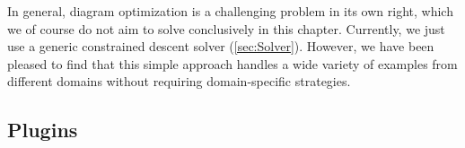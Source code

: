 
In general, diagram optimization is a challenging problem in its own right, which we of course do not aim to solve conclusively in this chapter.  Currently, we just use a generic constrained descent solver (\cref{sec:Solver}).  However, we have been pleased to find that this simple approach handles a wide variety of examples from different domains without requiring domain-specific strategies.


\subsection{Plugins}
\label{sec:PlugInDesign}





